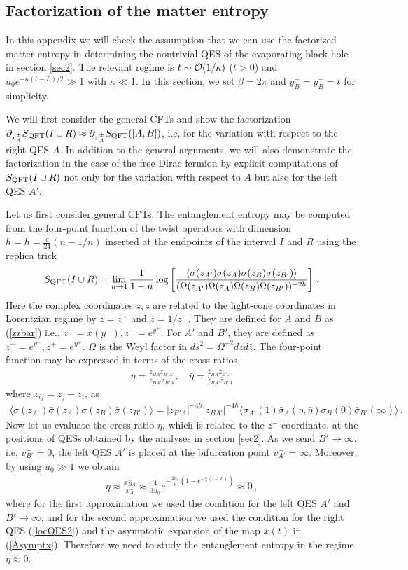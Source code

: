 \documentclass[11pt,oneside,letterpaper]{article}
\newcommand{\h}{\theta}
\newcommand{\f}{\frac}
\newcommand{\ra}{\rangle}
\let\z=\zeta \let\h=\eta \let\q=\theta \let\k=\kappa
\let\sg=\sigma \let\t=\tau \let\u=\upsilon \let\c=\chi
\let\f=\frac
\def\ba{\begin{eqnarray}}
\def\ea{\end{eqnarray}}
\numberwithin{equation}{section}
\def\t{{\theta}}
\def\k{\kappa}
\def\sg{{\sigma}}
\def\CO{{\cal O}}
\newcommand{\bz}{\bar{z}}
\def\pp{\partial}
\def\ba{\begin{eqnarray}}
\def\ea{\end{eqnarray}}
\def\f {\frac}
\def\ra{\rightarrow}
\def\q{\quad}
\def\z{\bar{z}}
\begin{document}
\begin{spacing}{1.1}
\appendix



\section{Factorization of the matter entropy}\label{app:matterentropy}

In this appendix we will check the assumption that we can use the factorized matter entropy in determining the nontrivial QES of the evaporating black hole in section \ref{sec2}. 
The relevant regime is $t\sim  \CO(1/\kappa)$ ($t>0$) and $u_0e^{-\kappa(t-L)/2}\gg 1$ with $\kappa\ll 1$. In this section, we set $\beta=2\pi$ and $y^-_B=y^+_B=t$ for simplicity. 
 
We will first consider the general CFTs and show  the factorization $\pp_{x^\pm_{A}}S_{\rm QFT}(I\cup R)\approx\pp_{x^\pm_{A}}S_{\rm QFT}([A,B])$, i.e, for the variation with respect to the right QES $A$. In addition to the general arguments,  we will also demonstrate the factorization in the case of the free Dirac fermion by explicit computations of $S_{\rm QFT}(I\cup R)$ not only for the variation with respect to $A$ but also for the left QES $A'$.

Let us first consider general CFTs. The entanglement entropy may be computed from the four-point function of the twist operators with dimension $h=\bar{h}=\f{c}{24}(n-1/n)$ inserted at the endpoints of the interval $I$ and $R$ using the replica trick
 \ba
 S_{\rm QFT}(I\cup R)=\lim_{n\ra 1}\frac{1}{1-n}\log \left[\frac{\langle\sg(z_{A'})\bar{\sg}(z_{A})\sg(z_B)\bar{\sg}(z_{B'})\rangle}{(\Omega(z_{A'}) \Omega(z_{A})\Omega(z_{B}) \Omega(z_{B'}))^{-2h}}\right]\, .
 \ea
Here the complex coordinates $z,\z$ are related to the  light-cone coordinates in Lorentzian regime by $\z=z^+$ and $z=1/z^-$. They are defined for $A$ and $B$ as (\ref{zzbar}) i.e., $z^- = x(y^-), z^+ =e^{y^+}$. For $A'$ and $B'$, they are defined as $z^- =e^{y^-}, z^+ =e^{y^+}$.  $\Omega$ is the Weyl factor in $ds^2=\Omega^{-2}dzd\z$.  The four-point  function may be expressed in terms of the cross-ratios,
\ba
\eta=\f{z_{BA}z_{B'A'}}{z_{BA'}z_{B'A}},  \quad
\bar{\eta}=\f{\bz_{BA}\bz_{B'A'}}{\bz_{BA'}\bz_{B'A}}
\ea
where $z_{ij}=z_j-z_i$, as
\ba
\langle\sg(z_{A'})\bar{\sg}(z_{A})\sg(z_B)\bar{\sg}(z_{B'})\rangle=|z_{B'A}|^{-4h}|z_{BA'}|^{-4h}\langle\sg_{A'}(1)\bar{\sg}_{A}(\eta,\bar{\eta})\sg_{B}(0)\bar{\sg}_{B'}(\infty)\rangle\, .
\ea
Now let us evaluate the cross-ratio $\eta$, which is related to the $z^-$ coordinate, at the positions of QESs obtained by the analyses in section \ref{sec2}. As we send $B'\ra\infty$, i.e, $v^-_{B'}=0$, the left QES $A'$ is placed at the bifurcation point $v^-_{A'}=\infty$. Moreover, by using $u_0 \gg 1$ we obtain
\ba
\eta\approx \f{x^-_{BA}}{x^-_A}\approx \f{4}{3u_0}e^{-\f{2u_0}{\kappa}(1-e^{-\f{\kappa}{2} (t-L)})}\approx 0\, ,
\ea
where for the first approximation we used the condition for the left QES $A'$ and $B'\ra \infty$, and for the second approximation we used  the condition for the right QES (\ref{locQES2}) and the asymptotic expansion of the map $x(t)$ in (\ref{Asymptx}).   Therefore we need to study the entanglement entropy in the regime $\eta \approx 0$. 



\end{spacing}
\end{document}
